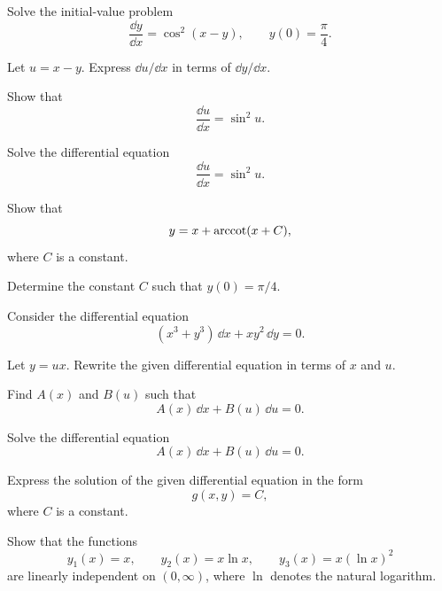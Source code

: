 \begin{problem}
Solve the initial-value problem
\[
\frac{\dd y}{\dd x}=\cos^2(x-y),
\qquad
y(0)=\frac{\pi}{4}.
\]
\begin{problemsubparts}
\item Let $u=x-y$. Express $\dd u/\dd x$ in terms of $\dd y/\dd x$.
\item Show that
\[
\frac{\dd u}{\dd x}=\sin^2u.
\]
\item Solve the differential equation
\[
\frac{\dd u}{\dd x}=\sin^2u.
\]
\item Show that
\[
y=x+\operatorname{arccot}(x+C),
\]
where $C$ is a constant.
\item Determine the constant $C$ such that $y(0)=\pi/4$.
\end{problemsubparts}
\end{problem}

\begin{problem}
Consider the differential equation
\[
(x^3+y^3)\,\dd x+xy^2\,\dd y=0.
\]
\begin{problemsubparts}
\item Let $y=ux$. Rewrite the given differential equation in terms of $x$ and $u$.
\item Find $A(x)$ and $B(u)$ such that
\[
A(x)\,\dd x+B(u)\,\dd u=0.
\]
\item Solve the differential equation
\[
A(x)\,\dd x+B(u)\,\dd u=0.
\]
\item Express the solution of the given differential equation in the form
\[
g(x,y)=C,
\]
where $C$ is a constant.
\end{problemsubparts}
\end{problem}

\begin{problem}
Show that the functions
\[
y_1(x)=x,
\qquad
y_2(x)=x\ln x,
\qquad
y_3(x)=x(\ln x)^2
\]
are linearly independent on $(0,\infty)$, where $\ln$ denotes the natural logarithm.
\end{problem}

